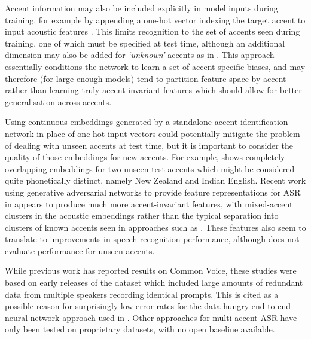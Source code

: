 \documentclass[a4paper]{article}
\begin{document}
Accent information may also be included explicitly in model inputs during training, for example by appending a one-hot vector indexing the target accent to input acoustic features \cite{arsikere2019MultiDialectAcousticModeling}.
This limits recognition to the set of accents seen during training, one of which must be specified at test time, although an additional dimension may also be added for \emph{`unknown'} accents as in \cite{yoo2019HighlyAdaptiveAcoustic}.
This approach essentially conditions the network to learn a set of accent-specific biases, and may therefore (for large enough models) tend to partition feature space by accent rather than learning truly accent-invariant features which should allow for better generalisation across accents.

Using continuous embeddings generated by a standalone accent identification network in place of one-hot input vectors could potentially mitigate the problem of dealing with unseen accents at test time, but it is important to consider the quality of those embeddings for new accents.
For example, \cite{jain2018ImprovedAccentedSpeech} shows completely overlapping embeddings for two unseen test accents which might be considered quite phonetically distinct, namely New Zealand and Indian English.
Recent work using generative adversarial networks to provide feature representations for ASR in \cite{chen2019AIPNetGenerativeAdversarial} appears to produce much more accent-invariant features, with mixed-accent clusters in the acoustic embeddings rather than the typical separation into clusters of known accents seen in approaches such as \cite{yoo2019HighlyAdaptiveAcoustic, jain2018ImprovedAccentedSpeech}.
These features also seem to translate to improvements in speech recognition performance, although \cite{chen2019AIPNetGenerativeAdversarial} does not evaluate performance for unseen accents.

While previous work \cite{jain2018ImprovedAccentedSpeech, viglino2019EndtoEndAccentedSpeech} has reported results on Common Voice, these studies were based on early releases of the dataset which included large amounts of redundant data from multiple speakers recording identical prompts.
This is cited as a possible reason for surprisingly low error rates for the data-hungry end-to-end neural network approach used in \cite{viglino2019EndtoEndAccentedSpeech}.
Other approaches \cite{chen2019AIPNetGenerativeAdversarial} for multi-accent ASR have only been tested on proprietary datasets, with no open baseline available.
\end{document}
